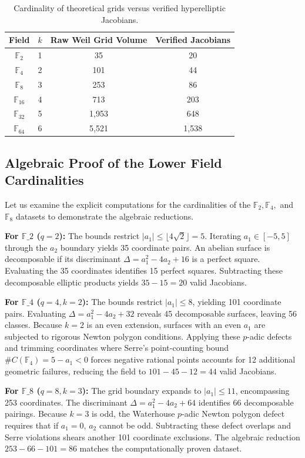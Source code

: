 \documentclass[letterpaper, 11pt]{article}
\begin{document}
\begin{table}[h!]
\centering
\begin{tabular}{cccc}
\toprule
Field & $k$ & Raw Weil Grid Volume & Verified Jacobians \\
\midrule
$\mathbb{F}_2$ & 1 & 35 & 20 \\
$\mathbb{F}_4$ & 2 & 101 & 44 \\
$\mathbb{F}_8$ & 3 & 253 & 86 \\
$\mathbb{F}_{16}$ & 4 & 713 & 203 \\
$\mathbb{F}_{32}$ & 5 & 1,953 & 648 \\
$\mathbb{F}_{64}$ & 6 & 5,521 & 1,538 \\
\bottomrule
\end{tabular}
\caption{Cardinality of theoretical grids versus verified hyperelliptic Jacobians.}
\end{table}

\subsection{Algebraic Proof of the Lower Field Cardinalities}
Let us examine the explicit computations for the cardinalities of the $\mathbb{F}_2, \mathbb{F}_4,$ and $\mathbb{F}_8$ datasets to demonstrate the algebraic reductions.

\textbf{For $\mathbb{F}\_2$ ($q=2$):}
The bounds restrict $\vert{}a_1\vert{} \le \lfloor 4\sqrt{2} \rfloor = 5$. Iterating $a_1 \in [-5, 5]$ through the $a_2$ boundary yields 35 coordinate pairs. An abelian surface is decomposable if its discriminant $\Delta = a_1^2 - 4a_2 + 16$ is a perfect square. Evaluating the 35 coordinates identifies 15 perfect squares. Subtracting these decomposable elliptic products yields $35 - 15 = 20$ valid Jacobians.

\textbf{For $\mathbb{F}\_4$ ($q=4, k=2$):}
The bounds restrict $\vert{}a_1\vert{} \le 8$, yielding 101 coordinate pairs. Evaluating $\Delta = a_1^2 - 4a_2 + 32$ reveals 45 decomposable surfaces, leaving 56 classes. Because $k=2$ is an even extension, surfaces with an even $a_1$ are subjected to rigorous Newton polygon conditions. Applying these $p$-adic defects and trimming coordinates where Serre's point-counting bound $\#C(\mathbb{F}_4) = 5 - a_1 < 0$ forces negative rational points accounts for 12 additional geometric failures, reducing the field to $101 - 45 - 12 = 44$ valid Jacobians.

\textbf{For $\mathbb{F}\_8$ ($q=8, k=3$):}
The grid boundary expands to $\vert{}a_1\vert{} \le 11$, encompassing 253 coordinates. The discriminant $\Delta = a_1^2 - 4a_2 + 64$ identifies 66 decomposable pairings. Because $k=3$ is odd, the Waterhouse $p$-adic Newton polygon defect requires that if $a_1 = 0$, $a_2$ cannot be odd. Subtracting these defect overlaps and Serre violations shears another 101 coordinate exclusions. The algebraic reduction $253 - 66 - 101 = 86$ matches the computationally proven dataset.
\end{document}
